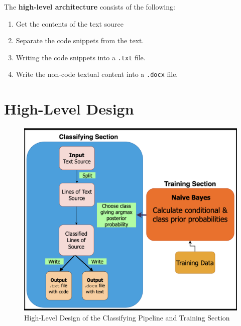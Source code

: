 \documentclass[12pt]{scrreprt}
\begin{document}
The \textbf{high-level architecture} consists of the following:
\begin{enumerate}
    \item Get the contents of the text source
    \item Separate the code snippets from the text.
    \item Writing the code snippets into a \texttt{.txt} file.
    \item Write the non-code textual content into a \texttt{.docx} file.
\end{enumerate}


\newpage 


\section{High-Level Design}


\begin{figure}[h]
    \centering
    \includegraphics[width=1.0\textwidth]{figures/NB-high-design.png}
    \caption{High-Level Design of the Classifying Pipeline and Training Section}
    \label{fig:high-level-design}
\end{figure}
\end{document}
